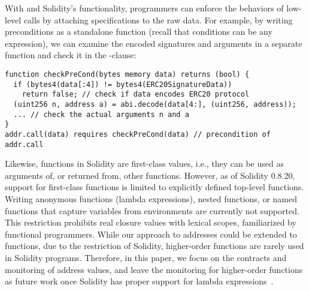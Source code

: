 With \lang and Solidity's  functionality, 
programmers can enforce the behaviors of low-level calls by attaching specifications to the raw data.%
For example, by writing preconditions as a standalone function
(recall that conditions can be any expression),
we can examine the encoded signatures and arguments in a separate function 
and check it in the -clause:
\begin{lstlisting}[language=Consol]
function checkPreCond(bytes memory data) returns (bool) {
  if (bytes4(data[:4]) != bytes4(ERC20SignatureData)) 
    return false; // check if data encodes ERC20 protocol
  (uint256 n, address a) = abi.decode(data[4:], (uint256, address));
  ... // check the actual arguments n and a
}
addr.call(data) requires checkPreCond(data) // precondition of addr.call
\end{lstlisting}

Likewise, functions in Solidity are first-class values, i.e., they can be used
as arguments of, or returned from, other functions.
However, 
as of Solidity 0.8.20,
support for first-class functions is limited to explicitly defined top-level functions.
Writing anonymous functions (lambda expressions), nested functions, or named functions that capture variables from environments are currently not supported.
This restriction prohibits real closure values with lexical scopes, familiarized by functional programmers.
While our approach to addresses could be extended to functions,
due to the restriction of Solidity, higher-order functions
are rarely used in Solidity programs.
Therefore, in this paper, we focus on the contracts and monitoring of address
values, and leave the monitoring for higher-order functions as future work once
Solidity has proper support for lambda expressions~\cite{soliditydoctypes}. %

